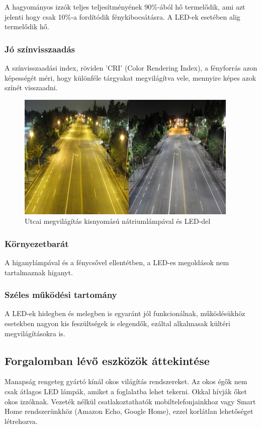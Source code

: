 \documentclass[../main.tex]{subfiles}
\begin{document}
            A hagyományos izzók teljes teljesítményének 90\%-ából hő termelődik, ami azt jelenti hogy csak 10\%-a fordítódik fénykibocsátásra. A LED-ek esetében alig termelődik hő. \citep{led_lighting}
        \subsubsection{Jó színvisszaadás}
            A színvisszaadási index, röviden 'CRI' (Color Rendering Index), a fényforrás azon képességét méri, hogy különféle tárgyakat megvilágítva vele, mennyire képes azok színét visszaadni. \citep{led_lighting2}
             \begin{figure}[h!]
                \centering
                \includegraphics[height=6cm]{irodalom_res/cri_los_angeles.jpg}
                \caption{Utcai megvilágítás kisnyomású nátriumlámpával és LED-del \cite{led_lighting3}}
             \end{figure}
             
        \subsubsection{Környezetbarát}
            A higanylámpával és a fénycsővel ellentétben, a LED-es megoldások nem tartalmaznak higanyt.
        \subsubsection{Széles működési tartomány}
            A LED-ek hidegben és melegben is egyaránt jól funkcionálnak, működésükhöz esetekben nagyon kis feszültségek is elegendők, ezáltal alkalmasak kültéri megvilágításokra is.
    
    \subsection{Forgalomban lévő eszközök áttekintése}
        Manapság rengeteg gyártó kínál okos világítás rendszereket. %
        Az okos égők nem csak átlagos LED lámpák, amiket a foglalatba lehet tekerni. Okkal hívják őket okos izzóknak. Vezeték nélkül csatlakoztathatók mobiltelefonjainkhoz vagy Smart Home rendszerünkhöz (Amazon Echo, Google Home), ezzel korlátlan lehetőséget létrehozva. 
        
\end{document}
